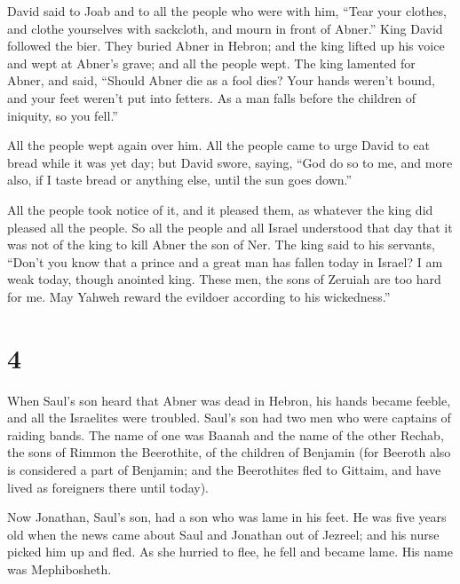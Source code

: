  David said to Joab and to all the people who were with
him, ``Tear your clothes, and clothe yourselves with sackcloth, and
mourn in front of Abner.'' King David followed the bier. 
They buried Abner in Hebron; and the king lifted up his voice and wept
at Abner's grave; and all the people wept.  The king
lamented for Abner, and said, ``Should Abner die as a fool dies?
 Your hands weren't bound, and your feet weren't put into
fetters. As a man falls before the children of iniquity, so you fell.''

All the people wept again over him.  All the people came
to urge David to eat bread while it was yet day; but David swore,
saying, ``God do so to me, and more also, if I taste bread or anything
else, until the sun goes down.''

 All the people took notice of it, and it pleased them,
as whatever the king did pleased all the people.  So all
the people and all Israel understood that day that it was not of the
king to kill Abner the son of Ner.  The king said to his
servants, ``Don't you know that a prince and a great man has fallen
today in Israel?  I am weak today, though anointed king.
These men, the sons of Zeruiah are too hard for me. May Yahweh reward
the evildoer according to his wickedness.''

\hypertarget{section-3}{%
\section{4}\label{section-3}}

 When Saul's son heard that Abner was dead in Hebron, his
hands became feeble, and all the Israelites were troubled.
 Saul's son had two men who were captains of raiding
bands. The name of one was Baanah and the name of the other Rechab, the
sons of Rimmon the Beerothite, of the children of Benjamin (for Beeroth
also is considered a part of Benjamin;  and the
Beerothites fled to Gittaim, and have lived as foreigners there until
today).

 Now Jonathan, Saul's son, had a son who was lame in his
feet. He was five years old when the news came about Saul and Jonathan
out of Jezreel; and his nurse picked him up and fled. As she hurried to
flee, he fell and became lame. His name was Mephibosheth.

